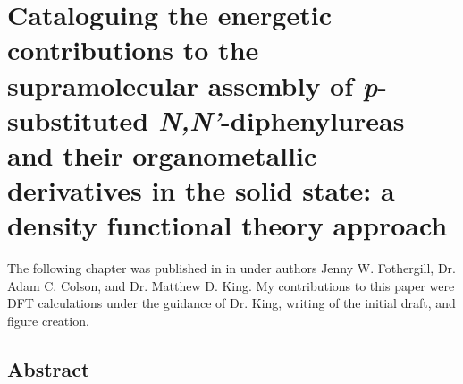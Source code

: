 \chapter{Cataloguing the energetic contributions to the supramolecular assembly of \textit{p}-substituted \textit{N,N'}-diphenylureas and their organometallic derivatives in the solid state: a density functional theory approach}
\label{chap:cataloguing}

The following chapter was published in  in  under authors Jenny W. Fothergill, Dr. Adam C. Colson, and Dr. Matthew D. King. My contributions to this paper were DFT calculations under the guidance of Dr. King, writing of the initial draft, and figure creation.

\section{Abstract}
